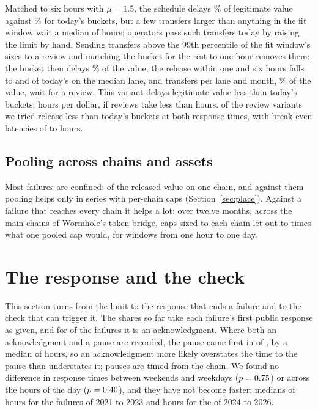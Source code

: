 \documentclass[conference,compsoc]{IEEEtran}
\numberwithin{equation}{section}
\theoremstyle{plain}
\theoremstyle{definition}
\theoremstyle{remark}
\begin{document}


Matched to six hours with $\mu = 1.5$, the schedule delays \ccipNoRevDelayedPct\% of legitimate value against \ccipInTodayDelayedPct\% for today's buckets, but a few transfers larger than anything in the fit window wait a median of \ccipNoRevWaitPFifty{} hours; operators pass such transfers today by raising the limit by hand. Sending transfers above the 99th percentile of the fit window's sizes to a review and matching the bucket for the rest to one hour removes them: the bucket then delays \ccipRevDelayedPct\% of the value, the release within one and six hours falls to \ccipRevCapOne{} and \ccipRevCapSix{} of today's on the median lane, and \ccipRevPerMonth{} transfers per lane and month, \ccipRevValuePct\% of the value, wait for a review. This variant delays legitimate value less than today's buckets, \ccipInTodayMeanDelayH{} hours per dollar, if reviews take less than \ccipRevBreakevenH{} hours. \ccipRevLowerBoth{} of the \ccipRevVariants{} review variants we tried release less than today's buckets at both response times, with break-even latencies of \ccipRevBreakevenMinH{} to \ccipRevBreakevenMaxH{} hours.

\subsection{Pooling across chains and assets}\label{sec:pooling}

Most failures are confined: \nSingleChain{} of the \nEvents{} released value on one chain, and against them pooling helps only in series with per-chain caps (Section~\ref{sec:place}). Against a failure that reaches every chain it helps a lot: over twelve months, across the \wormChainsWords{} main chains of Wormhole's token bridge, caps sized to each chain let out \poolLow{} to \poolHigh{} times what one pooled cap would, for windows from one hour to one day.

\section{The response and the check}\label{sec:response}

This section turns from the limit to the response that ends a failure and to the check that can trigger it. The shares so far take each failure's first public response as given, and for \nRespAck{} of the \nTimedEvents{} failures it is an acknowledgment. Where both an acknowledgment and a pause are recorded, the pause came first in \respPauseFirstN{} of \respBothN{}, by a median of \respAckAfterPauseH{} hours, so an acknowledgment more likely overstates the time to the pause than understates it; \respPauseOnchainN{} pauses are timed from the chain. We found no difference in response times between weekends and weekdays ($p = 0.75$) or across the hours of the day ($p = 0.40$), and they have not become faster: medians of \respEarlyMedH{} hours for the \respEarlyN{} failures of 2021 to 2023 and \respLateMedH{} hours for the \respLateN{} of 2024 to 2026.
\end{document}

